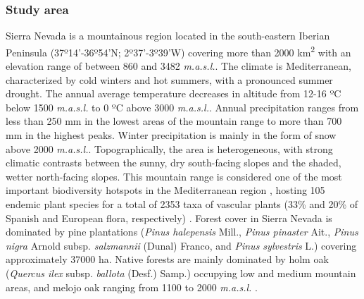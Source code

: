 \subsubsection{Study area}\label{sec:es:mat-studyarea}
Sierra Nevada is a mountainous region located in the south-eastern Iberian Peninsula  (37º14'-36º54'N; 2º37'-3º39'W) covering more than 2000 km\textsuperscript{2} with an elevation range of between 860 and 3482 \emph{m.a.s.l.}. The climate is Mediterranean, characterized by cold winters and hot summers, with a pronounced summer drought. The annual average temperature decreases in altitude from 12-16 ºC below 1500 \emph{m.a.s.l.} to 0 ºC above 3000 \emph{m.a.s.l.}. Annual precipitation ranges from less than 250 mm in the lowest areas of the mountain range to more than 700 mm in the highest peaks. Winter precipitation is mainly in the form of snow above 2000 \emph{m.a.s.l.}. Topographically, the area is heterogeneous, with strong climatic contrasts between the sunny, dry south-facing slopes and the shaded, wetter north-facing slopes. This mountain range is considered one of the most important biodiversity hotspots in the Mediterranean region \autocite{Blancaetal1998ThreatenedVascular}, hosting 105 endemic plant species for a total of 2353 taxa of vascular plants (33\% and 20\% of Spanish and European flora, respectively) \autocite{Lorite2016UpdatedChecklist}. Forest cover in Sierra Nevada is dominated by pine plantations (\emph{Pinus halepensis} Mill., \emph{Pinus pinaster} Ait., \emph{Pinus nigra} Arnold subsp. \emph{salzmannii} (Dunal) Franco, and \emph{Pinus sylvestris} L.) covering approximately 37000 ha. Native forests are mainly dominated by holm oak (\emph{Quercus ilex} subsp. \emph{ballota} (Desf.) Samp.) occupying low and medium mountain areas, and melojo oak ranging from 1100 to 2000 \emph{m.a.s.l.} \autocite{PerezLuqueetal2019MapEcosystems}.

